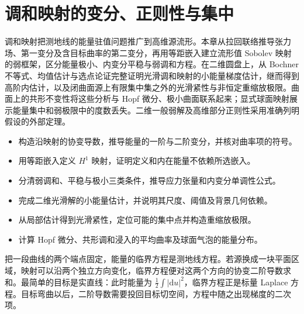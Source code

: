 
% 
% 

\chapter{调和映射的变分、正则性与集中}
\label{g3:ch:18}

\begin{chapterabstract}
	调和映射把测地线的能量驻值问题推广到高维源流形。本章从拉回联络推导张力场、第一变分及含目标曲率的第二变分，再用等距嵌入建立流形值 Sobolev 映射的弱框架，区分能量极小、内变分平稳与弱调和方程。在二维圆盘上，从 Bochner 不等式、均值估计与选点论证完整证明光滑调和映射的小能量梯度估计，继而得到高阶内估计，以及闭曲面源上有限集中集之外的光滑紧性与非恒定重缩放极限。曲面上的共形不变性将这些分析与 Hopf 微分、极小曲面联系起来；显式球面映射展示能量集中和弱极限中的度数丢失。二维一般弱解及高维部分正则性采用准确列明假设的外部定理。
\end{chapterabstract}

\begin{learninggoals}
	\begin{itemize}
		\item 构造沿映射的协变导数，推导能量的一阶与二阶变分，并核对曲率项的符号。
		\item 用等距嵌入定义 \(H^1\) 映射，证明定义和内在能量不依赖所选嵌入。
		\item 分清弱调和、平稳与极小三类条件，推导应力张量和内变分单调性公式。
		\item 完成二维光滑解的小能量估计，并说明其尺度、阈值及背景几何依赖。
		\item 从局部估计得到光滑紧性，定位可能的集中点并构造重缩放极限。
		\item 计算 Hopf 微分、共形调和浸入的平均曲率及球面气泡的能量分布。
	\end{itemize}
\end{learninggoals}

把一段曲线的两个端点固定，能量的临界方程是测地线方程。若源换成一块平面区域，映射可以沿两个独立方向变化，临界方程便对这两个方向的协变二阶导数求和。最简单的目标是实直线：此时能量为 \(\frac12\int|\mathrm du|^2\)，临界方程正是标量 Laplace 方程。目标弯曲以后，二阶导数需要投回目标切空间，方程中随之出现梯度的二次项。

